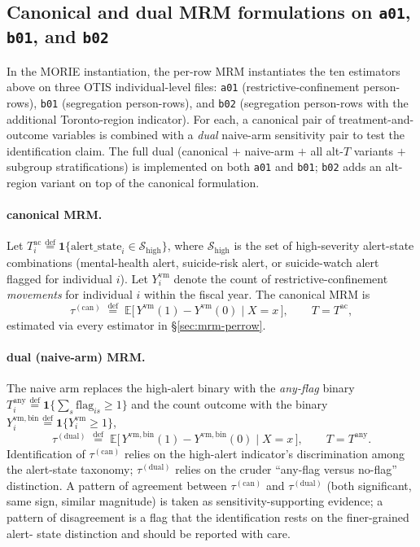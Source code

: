 \documentclass[11pt,a4paper]{article}
\theoremstyle{plain}
\theoremstyle{definition}
\theoremstyle{remark}
\newcommand{\E}{\mathbb{E}}
\newcommand{\one}{\mathbf{1}}
\newcommand{\eqdef}{\mathrel{\stackrel{\mathrm{def}}{=}}}
\begin{document}
\subsection{Canonical and dual MRM formulations on \texttt{a01},
            \texttt{b01}, and \texttt{b02}}
\label{sec:dual-rf}

In the MORIE instantiation, the per-row MRM instantiates the
ten estimators above on three OTIS individual-level files:
\texttt{a01} (restrictive-confinement person-rows), \texttt{b01}
(segregation person-rows), and \texttt{b02} (segregation
person-rows with the additional Toronto-region indicator). For
each, a canonical pair of treatment-and-outcome variables is
combined with a \emph{dual} naive-arm sensitivity pair to test
the identification claim. The full dual (canonical $+$ naive-arm
$+$ all alt-$T$ variants $+$ subgroup stratifications) is
implemented on both \texttt{a01} and \texttt{b01}; \texttt{b02}
adds an alt-region variant on top of the canonical formulation.

\paragraph{canonical MRM.}
Let $T^{\mathrm{ac}}_{i} \eqdef \one\{\mathrm{alert\_state}_{i}
\in \mathcal{S}_{\mathrm{high}}\}$, where
$\mathcal{S}_{\mathrm{high}}$ is the set of high-severity
alert-state combinations (mental-health alert, suicide-risk
alert, or suicide-watch alert flagged for individual $i$). Let
$Y^{\mathrm{vm}}_{i}$ denote the count of restrictive-confinement
\emph{movements} for individual $i$ within the fiscal year. The
canonical MRM is
\begin{equation}
  \tau^{\mathrm{(can)}}
  \;\eqdef\;
   \E\!\bigl[\,Y^{\mathrm{vm}}(1) - Y^{\mathrm{vm}}(0)\;\big|\;
              X = x\,\bigr],
   \qquad T = T^{\mathrm{ac}},
  \label{eq:rf-canonical}
\end{equation}
estimated via every estimator in
\S\ref{sec:mrm-perrow}.

\paragraph{dual (naive-arm) MRM.}
The naive arm replaces the high-alert binary with the
\emph{any-flag} binary
$T^{\mathrm{any}}_{i} \eqdef \one\{\sum_{s} \mathrm{flag}_{is}
\ge 1\}$ and the count outcome with the binary
$Y^{\mathrm{vm,bin}}_{i} \eqdef \one\{Y^{\mathrm{vm}}_{i} \ge 1\}$,
\begin{equation}
  \tau^{\mathrm{(dual)}}
  \;\eqdef\;
   \E\!\bigl[\,Y^{\mathrm{vm,bin}}(1) - Y^{\mathrm{vm,bin}}(0)\;\big|\;
              X = x\,\bigr],
   \qquad T = T^{\mathrm{any}}.
  \label{eq:rf-dual}
\end{equation}
Identification of $\tau^{\mathrm{(can)}}$ relies on the high-alert
indicator's discrimination among the alert-state taxonomy;
$\tau^{\mathrm{(dual)}}$ relies on the cruder ``any-flag versus
no-flag'' distinction. A pattern of agreement between
$\tau^{\mathrm{(can)}}$ and $\tau^{\mathrm{(dual)}}$ (both
significant, same sign, similar magnitude) is taken as
sensitivity-supporting evidence; a pattern of disagreement is a
flag that the identification rests on the finer-grained alert-
state distinction and should be reported with care.
\end{document}
